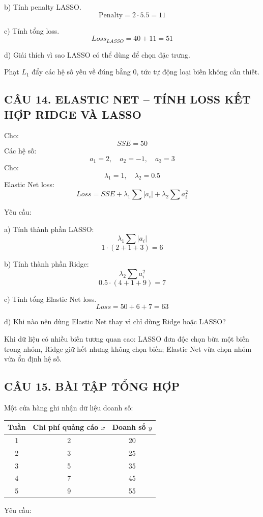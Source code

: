 \documentclass[a4paper,12pt]{article}
\begin{document}
b) Tính penalty LASSO.
\[ \text{Penalty} = 2 \cdot 5.5 = 11 \]

c) Tính tổng loss.
\[ Loss_{LASSO} = 40 + 11 = 51 \]

d) Giải thích vì sao LASSO có thể dùng để chọn đặc trưng.

Phạt $L_1$ đẩy các hệ số yếu về đúng bằng 0, tức tự động loại biến không cần thiết.

\subsection*{CÂU 14. ELASTIC NET -- TÍNH LOSS KẾT HỢP RIDGE VÀ LASSO}

Cho:
\[ SSE = 50 \]
Các hệ số:
\[ a_1 = 2, \quad a_2 = -1, \quad a_3 = 3 \]
Cho:
\[ \lambda_1 = 1, \quad \lambda_2 = 0.5 \]
Elastic Net loss:
\[ Loss = SSE + \lambda_1 \sum |a_i| + \lambda_2 \sum a_i^2 \]

Yêu cầu:

a) Tính thành phần LASSO:
\[ \lambda_1 \sum |a_i| \]
\[ 1 \cdot (2 + 1 + 3) = 6 \]

b) Tính thành phần Ridge:
\[ \lambda_2 \sum a_i^2 \]
\[ 0.5 \cdot (4 + 1 + 9) = 7 \]

c) Tính tổng Elastic Net loss.
\[ Loss = 50 + 6 + 7 = 63 \]

d) Khi nào nên dùng Elastic Net thay vì chỉ dùng Ridge hoặc LASSO?

Khi dữ liệu có nhiều biến tương quan cao: LASSO đơn độc chọn bừa một biến trong nhóm,
Ridge giữ hết nhưng không chọn biến; Elastic Net vừa chọn nhóm vừa ổn định hệ số.

\subsection*{CÂU 15. BÀI TẬP TỔNG HỢP}

Một cửa hàng ghi nhận dữ liệu doanh số:
\begin{center}
\begin{tabular}{|c|c|c|}
\hline
Tuần & Chi phí quảng cáo $x$ & Doanh số $y$ \\
\hline
1 & 2 & 20 \\
2 & 3 & 25 \\
3 & 5 & 35 \\
4 & 7 & 45 \\
5 & 9 & 55 \\
\hline
\end{tabular}
\end{center}

Yêu cầu:
\end{document}
